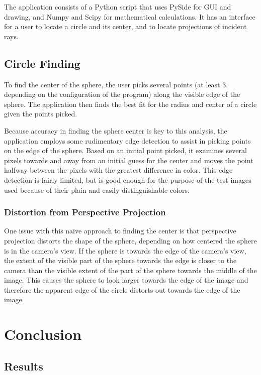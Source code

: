 \documentclass{thesis}
\begin{document}
The application consists of a Python script that uses PySide for GUI and drawing, and Numpy and Scipy for mathematical calculations. It has an interface for a user to locate a circle and its center, and to locate projections of incident rays.

\section{Circle Finding}
To find the center of the sphere, the user picks several points (at least 3, depending on the configuration of the program) along the visible edge of the sphere. The application then finds the best fit for the radius and center of a circle given the points picked.

Because accuracy in finding the sphere center is key to this analysis, the application employs some rudimentary edge detection to assist in picking points on the edge of the sphere. Based on an initial point picked, it examines several pixels towards and away from an initial guess for the center and moves the point halfway between the pixels with the greatest difference in color. This edge detection is fairly limited, but is good enough for the purpose of the test images used because of their plain and easily distinguishable colors.

\subsection{Distortion from Perspective Projection}
One issue with this naive approach to finding the center is that perspective projection distorts the shape of the sphere, depending on how centered the sphere is in the camera's view. If the sphere is towards the edge of the camera's view, the extent of the visible part of the sphere towards the edge is closer to the camera than the visible extent of the part of the sphere towards the middle of the image. This causes the sphere to look larger towards the edge of the image and therefore the apparent edge of the circle distorts out towards the edge of the image.




\chapter{Conclusion}
\section{Results}
\end{document}
